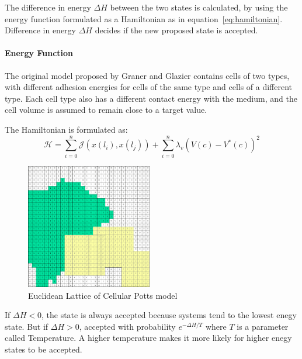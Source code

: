 \documentclass[a4paper,10pt,twocolumn]{article}
\begin{document}
        The difference in energy $\Delta H$ between the two states is calculated, by using the 
        energy function formulated as a Hamiltonian as in equation~\ref{eq:hamiltonian}.
        Difference in energy $\Delta H$ decides if the new proposed state is accepted.

        \paragraph{Energy Function}
        The original model proposed by Graner and Glazier\cite{cellular_potts} contains cells of two types, 
        with different adhesion energies for cells of the same type and cells of a 
        different type. Each cell type also has a different contact energy with the 
        medium, and the cell volume is assumed to remain close to a target value. 
        
        The Hamiltonian is formulated as:
        \begin{equation}
            \mathcal{H} = \sum_{i=0}^{n} \mathcal{J}(x(l_i), x(l_j)) + \sum_{i=0}^{n} \lambda_v {(V(c) - V^*(c))}^2
            \label{eq:hamiltonian}
        \end{equation}

        \begin{figure}[H]
            \centering
            \includegraphics[width=0.49\textwidth]{../images/cpm_lattice.png}
            \caption{Euclidean Lattice of Cellular Potts model}\label{fig:cpm}
        \end{figure}

        If $\Delta H < 0$, the state is always accepted because systems tend to the lowest enegy state.
        But if $\Delta H > 0$, accepted with probability $e^{-\Delta H / T}$
        where $T$ is a parameter called Temperature.
        A higher temperature makes it more likely for higher enegy states to be accepted. 
\end{document}
